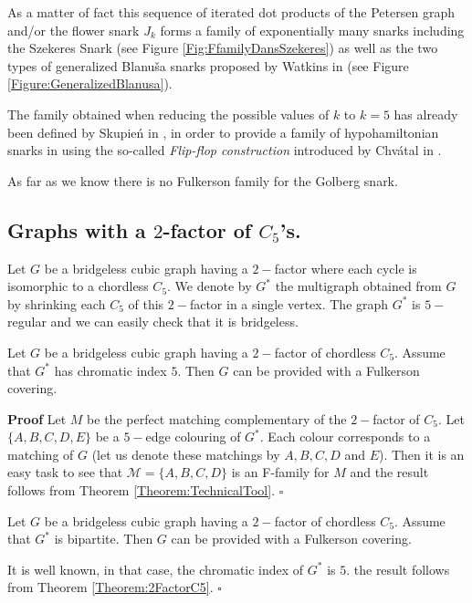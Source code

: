\documentclass{amsart}
\theoremstyle{definition}
\theoremstyle{remark}
\newenvironment{prf}{{\bf \noindent Proof } }{\hfill$\square$\\}
\begin{document}
As a matter of fact this sequence of iterated dot products of the Petersen graph
and/or the flower snark $J_k$ forms a family of exponentially many snarks
including the Szekeres Snark (see Figure \ref{Fig:FfamilyDansSzekeres}) as well as the two types of generalized Blanu\v{s}a snarks proposed by Watkins in \cite{Wat89} (see Figure \ref{Figure:GeneralizedBlanusa}). 

The family obtained when reducing the possible values of $k$ to $k=5$  has already been defined by Skupie\'n in \cite{Sku89}, in order to provide a family
of hypohamiltonian snarks in using the so-called {\em Flip-flop construction}
introduced by Chv\'atal in \cite{Chv73}.

As far as we know there is no Fulkerson family for the Golberg snark.

\subsection{Graphs with a $2$-factor of $C_5$'s.}
Let $G$ be a bridgeless cubic graph having a $2-$factor where each
cycle is isomorphic to a chordless $C_{5}$. We denote by $G^{*}$ the
multigraph obtained from $G$ by shrinking each $C_{5}$ of this
$2-$factor in a single vertex. The graph $G^{*}$ is $5-$regular and
we can easily check that it is bridgeless.

\begin{thm} \label{Theorem:2FactorC5}  Let $G$ be a bridgeless cubic graph
having a $2-$factor
of chordless $C_{5}$. Assume that  $G^{*}$
 has chromatic index $5$. Then $G$ can be provided with a Fulkerson covering.
\end{thm}
\begin{prf} Let $M$ be the perfect matching complementary of the $2-$factor of
$C_{5}$.
Let $\{A,B,C,D,E\}$ be a $5-$edge colouring of $G^{*}$. Each colour
corresponds to a matching of $G$ (let us denote these matchings by
$A,B,C,D$ and $E$). Then it is an easy task to see that $\mathcal
M=\{A,B,C,D\}$ is an F-family for $M$ and the result follows from
Theorem \ref{Theorem:TechnicalTool}.
\end{prf}

\begin{thm} \label{Cor:2FactorC5Biparti}  Let $G$ be a bridgeless cubic graph
having a $2-$factor of
 chordless $C_{5}$. Assume that  $G^{*}$
 is bipartite. Then $G$ can be provided with a Fulkerson covering.
\end{thm}
\begin{prf}
It is well known, in that case, the chromatic index of $G^{*}$ is
$5$. the result follows from Theorem \ref{Theorem:2FactorC5}.
\end{prf}
\end{document}
